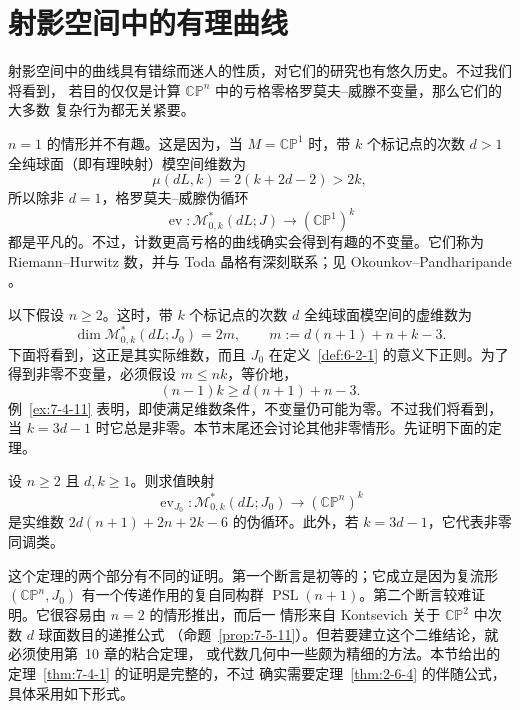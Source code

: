 
\section{射影空间中的有理曲线}\label{sec:7-4}

射影空间中的曲线具有错综而迷人的性质，对它们的研究也有悠久历史。不过我们将看到，
若目的仅仅是计算 $\mathbb{CP}^n$ 中的亏格零格罗莫夫--威滕不变量，那么它们的大多数
复杂行为都无关紧要。

$n=1$ 的情形并不有趣。这是因为，当 $M=\mathbb{CP}^1$ 时，带 $k$ 个标记点的次数
$d>1$ 全纯球面（即有理映射）模空间维数为
\[
  \mu(dL,k)=2(k+2d-2)>2k,
\]
所以除非 $d=1$，格罗莫夫--威滕伪循环
\[
  \operatorname{ev}:\mathcal M^*_{0,k}(dL;J)\longrightarrow(\mathbb{CP}^1)^k
\]
都是平凡的。不过，计数更高亏格的曲线确实会得到有趣的不变量。它们称为
Riemann--Hurwitz 数，并与 Toda 晶格有深刻联系；见 Okounkov--Pandharipande
。

以下假设 $n\ge2$。这时，带 $k$ 个标记点的次数 $d$ 全纯球面模空间的虚维数为
\[
  \dim\mathcal M^*_{0,k}(dL;J_0)=2m,
  \qquad
  m:=d(n+1)+n+k-3.
\]
下面将看到，这正是其实际维数，而且 $J_0$ 在定义~\ref{def:6-2-1} 的意义下正则。为了
得到非零不变量，必须假设 $m\le nk$，等价地，
\[
  (n-1)k\ge d(n+1)+n-3.
\]
例~\ref{ex:7-4-11} 表明，即使满足维数条件，不变量仍可能为零。不过我们将看到，当
$k=3d-1$ 时它总是非零。本节末尾还会讨论其他非零情形。先证明下面的定理。

\begin{theorem}\label{thm:7-4-1}
设 $n\ge2$ 且 $d,k\ge1$。则求值映射
\[
  \operatorname{ev}_{J_0}:\mathcal M^*_{0,k}(dL;J_0)
  \longrightarrow(\mathbb{CP}^n)^k
\]
是实维数 $2d(n+1)+2n+2k-6$ 的伪循环。此外，若 $k=3d-1$，它代表非零同调类。
\end{theorem}

这个定理的两个部分有不同的证明。第一个断言是初等的；它成立是因为复流形
$(\mathbb{CP}^n,J_0)$ 有一个传递作用的复自同构群
$\operatorname{PSL}(n+1)$。第二个断言较难证明。它很容易由 $n=2$ 的情形推出，而后一
情形来自 Kontsevich 关于 $\mathbb{CP}^2$ 中次数 $d$ 球面数目的递推公式
（命题~\ref{prop:7-5-11}）。但若要建立这个二维结论，就必须使用第~10 章的粘合定理，
或代数几何中一些颇为精细的方法。本节给出的定理~\ref{thm:7-4-1} 的证明是完整的，不过
确实需要定理~\ref{thm:2-6-4} 的伴随公式，具体采用如下形式。

